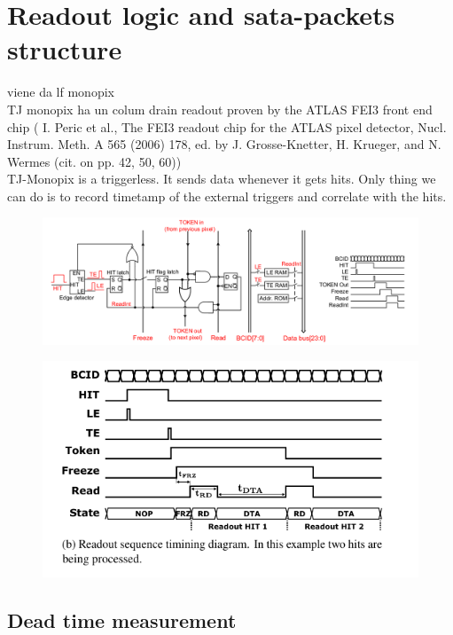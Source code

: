 \section{Readout logic and sata-packets structure}
    viene da lf monopix\\
    TJ monopix ha un colum drain readout proven by the ATLAS FEI3 front end chip (
    I. Peric et al., The FEI3 readout chip for the ATLAS pixel detector,
    Nucl. Instrum. Meth. A 565 (2006) 178, ed. by J. Grosse-Knetter, H. Krueger, and N. Wermes
    (cit. on pp. 42, 50, 60))\\

    TJ-Monopix is a triggerless. It sends data whenever it gets hits. Only thing we can do is to record timetamp of the external triggers and correlate with the hits. 
    \begin{figure}[h!]
        \centering
        \includegraphics[width=.7\linewidth]{figures/Monopix1/Monopix1_readout_schematics.png}
        \caption{}
        \label{fig:Monopix1_readout_schematics}
    \end{figure}

    \begin{figure}[h!]
        \centering
        \includegraphics[width=.7\linewidth]{figures/Monopix1/readout_timing.png}
        \caption{}
        \label{fig:readout_timing}
    \end{figure}
    
    \subsection{Dead time measurement}

